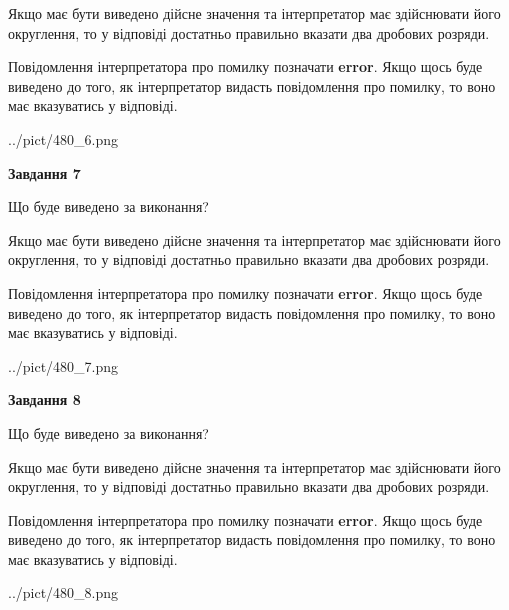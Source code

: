 \documentclass[12pt, ukrainian]{article}
\begin{document}
{\begin {Large}
Якщо має бути виведено дійсне значення та інтерпретатор має здійснювати його округлення, 
то у відповіді достатньо правильно вказати два дробових розряди.

Повідомлення інтерпретатора про помилку позначати \textbf{error}.
Якщо щось буде виведено до того, як інтерпретатор видасть повідомлення про помилку, 
то воно має вказуватись у відповіді. \par

\begin{center}
	{../pict/480_6.png}
\end{center}
\newpage

{\begin {center}\textbf{Завдання 7}\end {center}}\par
Що буде виведено за виконання? \par

Якщо має бути виведено дійсне значення та інтерпретатор має здійснювати його округлення, 
то у відповіді достатньо правильно вказати два дробових розряди.

Повідомлення інтерпретатора про помилку позначати \textbf{error}.
Якщо щось буде виведено до того, як інтерпретатор видасть повідомлення про помилку, 
то воно має вказуватись у відповіді. \par

\begin{center}
	{../pict/480_7.png}
\end{center}
\newpage

{\begin {center}\textbf{Завдання 8}\end {center}}\par
Що буде виведено за виконання? \par

Якщо має бути виведено дійсне значення та інтерпретатор має здійснювати його округлення, 
то у відповіді достатньо правильно вказати два дробових розряди.

Повідомлення інтерпретатора про помилку позначати \textbf{error}.
Якщо щось буде виведено до того, як інтерпретатор видасть повідомлення про помилку, 
то воно має вказуватись у відповіді. \par

\begin{center}
	{../pict/480_8.png}
\end{center}
\newpage


\end{Large}}
\end{document}

